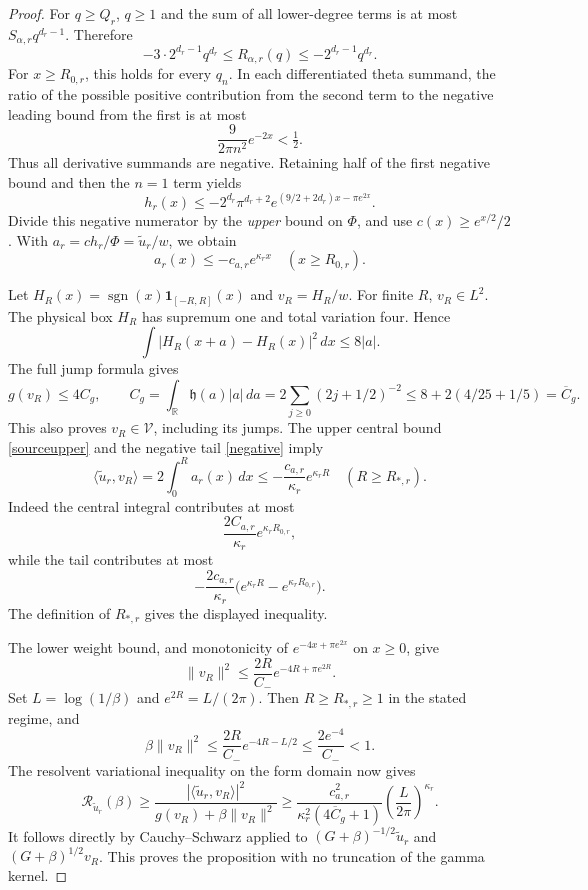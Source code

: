 \documentclass[11pt]{article}
\theoremstyle{remark}
\newcommand{\dd}{\,d}
\newcommand{\sgn}{\operatorname{sgn}}
\newcommand{\R}{\mathbb R}
\begin{document}
\begin{proof}
For \(q\ge Q_r\), \(q\ge1\) and the sum of all lower-degree
terms is at most \(S_{\alpha,r}q^{d_r-1}\).
Therefore
\[
 -3\cdot2^{d_r-1}q^{d_r}
       \le R_{\alpha,r}(q)\le-2^{d_r-1}q^{d_r}.
\]
For \(x\ge R_{0,r}\), this holds for every \(q_n\).
In each differentiated theta summand, the ratio of the possible
positive contribution from the second term to the negative
leading bound from the first is at most
\[
 \frac{9}{2\pi n^2}e^{-2x}<\tfrac12.
\]
Thus all derivative summands are negative. Retaining half of the
first negative bound and then the \(n=1\) term yields
\[
 h_r(x)\le-2^{d_r}\pi^{d_r+2}
                  e^{(9/2+2d_r)x-\pi e^{2x}}.
\]
Divide this negative numerator by the \emph{upper} bound on
\(\Phi\), and use \(c(x)\ge e^{x/2}/2\). With
\(a_r=c h_r/\Phi=\widetilde u_r/w\), we obtain
\begin{equation}\label{negative}
                 a_r(x)\le-c_{a,r}e^{\kappa_rx}
                             \quad(x\ge R_{0,r}).
\end{equation}

Let \(H_R(x)=\sgn(x)\mathbf1_{[-R,R]}(x)\) and \(v_R=H_R/w\).
For finite \(R\), \(v_R\in L^2\).
The physical box \(H_R\) has supremum one and total variation four.
Hence
\[
 \int|H_R(x+a)-H_R(x)|^2\dd x\le8|a|.
\]
The full jump formula gives
\[
 g(v_R)\le4 C_g,\qquad
 C_g=\int_\R\mathfrak h(a)|a|\dd a
     =2\sum_{j\ge0}(2j+1/2)^{-2}
     \le8+2(4/25+1/5)=\overline C_g.
\]
This also proves \(v_R\in\mathcal V\), including its jumps.
The upper central bound \eqref{sourceupper} and the negative tail
\eqref{negative} imply
\[
 \langle\widetilde u_r,v_R\rangle
 =2\int_0^R a_r(x)\dd x
 \le-\frac{c_{a,r}}{\kappa_r}e^{\kappa_rR}
                        \quad(R\ge R_{*,r}).
\]
Indeed the central integral contributes at most
\[
 \frac{2C_{a,r}}{\kappa_r}e^{\kappa_rR_{0,r}},
\]
while the tail contributes at most
\[
 -\frac{2c_{a,r}}{\kappa_r}
       \bigl(e^{\kappa_rR}-e^{\kappa_rR_{0,r}}\bigr).
\]
The definition of \(R_{*,r}\) gives the displayed inequality.

The lower weight bound, and monotonicity of
\(e^{-4x+\pi e^{2x}}\) on \(x\ge0\), give
\[
 \|v_R\|^2\le\frac{2R}{C_-}e^{-4R+\pi e^{2R}}.
\]
Set \(L=\log(1/\beta)\) and \(e^{2R}=L/(2\pi)\).
Then \(R\ge R_{*,r}\ge1\) in the stated regime, and
\[
 \beta\|v_R\|^2
 \le\frac{2R}{C_-}e^{-4R-L/2}
 \le\frac{2e^{-4}}{C_-}<1.
\]
The resolvent variational inequality on the form domain now gives
\[
 \mathcal R_{\widetilde u_r}(\beta)
 \ge
 \frac{|\langle\widetilde u_r,v_R\rangle|^2}
 {g(v_R)+\beta\|v_R\|^2}
 \ge
 \frac{c_{a,r}^2}{\kappa_r^2(4\overline C_g+1)}
                     \left(\frac{L}{2\pi}\right)^{\kappa_r}.
\]
It follows directly by Cauchy--Schwarz applied to
\((G+\beta)^{-1/2}\widetilde u_r\) and
\((G+\beta)^{1/2}v_R\).
This proves the proposition with no truncation of the gamma kernel.
\end{proof}
\end{document}
